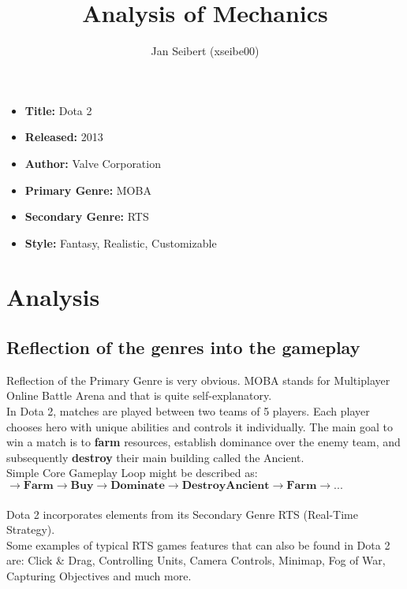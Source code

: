 \documentclass[a4paper,10pt,english]{article}
\title{%
Analysis of Mechanics%
}
\author{%
Jan Seibert (xseibe00)%
}
\date{}
\begin{document}
\maketitle
\thispagestyle{empty}

{%
\large

\begin{itemize}

\item[] \textbf{Title:} {Dota 2}

\item[] \textbf{Released:} {2013}

\item[] \textbf{Author:} {Valve Corporation}

\item[] \textbf{Primary Genre:} {MOBA}

\item[] \textbf{Secondary Genre:} {RTS}

\item[] \textbf{Style:} {Fantasy, Realistic, Customizable}

\end{itemize}

}

\section*{\centering Analysis}

\subsection*{Reflection of the genres into the gameplay}

Reflection of the Primary Genre is very obvious. MOBA stands for Multiplayer Online Battle Arena and that is quite self-explanatory. \\
In Dota 2, matches are played between two teams of 5 players. Each player chooses hero with unique abilities and controls it individually. The main goal to win a match is to \textbf{farm} resources, establish dominance over the enemy team, and subsequently \textbf{destroy} their main building called the Ancient. \\
Simple Core Gameplay Loop might be described as: \\
$\mathbf{\rightarrow Farm \rightarrow Buy \rightarrow Dominate \rightarrow Destroy Ancient \rightarrow Farm \rightarrow ...}$ \\ \\
Dota 2 incorporates elements from its Secondary Genre RTS (Real-Time Strategy). \\
Some examples of typical RTS games features that can also be found in Dota 2 are: Click \& Drag, Controlling Units, Camera Controls, Minimap, Fog of War, Capturing Objectives and much more.
\end{document}
